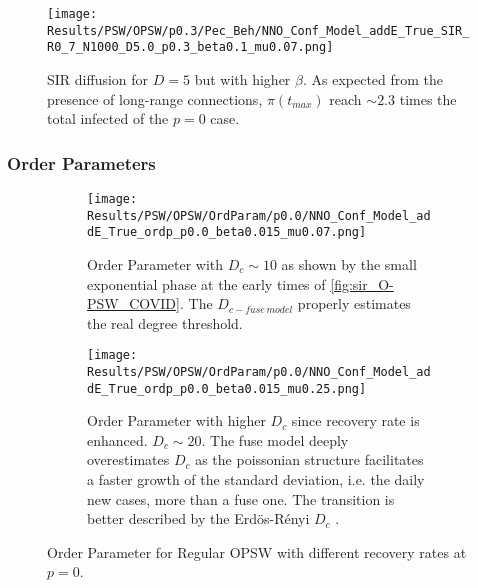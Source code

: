 \documentclass[a4paper,10pt,twoside]{book} %
\theoremstyle{definition}
\begin{document}
\begin{figure}[H]
	\centering
	\texttt{[image: Results/PSW/OPSW/p0.3/Pec\_Beh/NNO\_Conf\_Model\_addE\_True\_SIR\_R0\_7\_N1000\_D5.0\_p0.3\_beta0.1\_mu0.07.png]}
	\caption{SIR diffusion for $ D = 5$ but with higher $\beta$. As expected from the presence of long-range connections, $\pi(t_{max})$ reach $\sim 2.3$ times the total infected of the $ p=0$  case.}
	\label{fig:sir_O-PSW_D5_p0.3_b0.1}
\end{figure}

\clearpage
\subsubsection*{Order Parameters}
\begin{figure}[t]
	\begin{subfigure}[t]{0.48\linewidth}
		\centering
		\texttt{[image: Results/PSW/OPSW/OrdParam/p0.0/NNO\_Conf\_Model\_addE\_True\_ordp\_p0.0\_beta0.015\_mu0.07.png]} 
		\caption{Order Parameter with $D_c \sim 10$ as shown by the small exponential phase at the early times of \autoref{fig:sir_O-PSW_COVID}. The $ D_{c-fuse\, model}$ properly estimates the real degree threshold.}
		\label{fig:Ordp_OPSW_COVID19_D14}
	\end{subfigure}
	\begin{subfigure}[t]{0.48\linewidth}
		\centering
		\texttt{[image: Results/PSW/OPSW/OrdParam/p0.0/NNO\_Conf\_Model\_addE\_True\_ordp\_p0.0\_beta0.015\_mu0.25.png]}
		\caption{Order Parameter with higher $D_c$ since recovery rate is enhanced. $D_c \sim 20$.
		The fuse model deeply overestimates $ D_c$ as the poissonian structure facilitates a faster growth of the standard deviation, i.e. the daily new cases, more than a fuse one. The transition is better described by the Erdös-Rényi $ D_c$ .}
		\label{fig:Ordp_OPSW_highmu_COVID19}
	\end{subfigure}
	\caption{Order Parameter for Regular OPSW with different recovery rates at $p = 0$. }
	\label{fig:Ordp_OPSW_COVID19_panel}
\end{figure}
\end{document}
